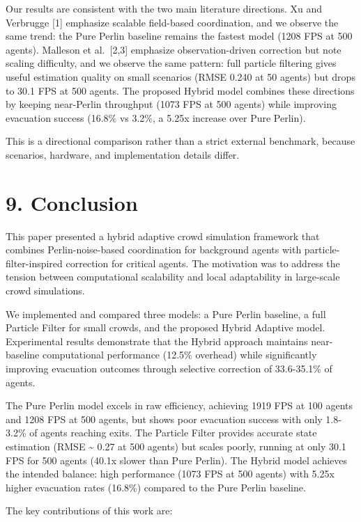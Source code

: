 \documentclass[
  11pt,
]{article}
\begin{document}
Our results are consistent with the two main literature directions. Xu
and Verbrugge {[}1{]} emphasize scalable field-based coordination, and
we observe the same trend: the Pure Perlin baseline remains the fastest
model (1208 FPS at 500 agents). Malleson et al.~{[}2,3{]} emphasize
observation-driven correction but note scaling difficulty, and we
observe the same pattern: full particle filtering gives useful
estimation quality on small scenarios (RMSE 0.240 at 50 agents) but
drops to 30.1 FPS at 500 agents. The proposed Hybrid model combines
these directions by keeping near-Perlin throughput (1073 FPS at 500
agents) while improving evacuation success (16.8\% vs 3.2\%, a 5.25x
increase over Pure Perlin).

This is a directional comparison rather than a strict external
benchmark, because scenarios, hardware, and implementation details
differ.

\section{9. Conclusion}\label{conclusion}

This paper presented a hybrid adaptive crowd simulation framework that
combines Perlin-noise-based coordination for background agents with
particle-filter-inspired correction for critical agents. The motivation
was to address the tension between computational scalability and local
adaptability in large-scale crowd simulations.

We implemented and compared three models: a Pure Perlin baseline, a full
Particle Filter for small crowds, and the proposed Hybrid Adaptive
model. Experimental results demonstrate that the Hybrid approach
maintains near-baseline computational performance (12.5\% overhead)
while significantly improving evacuation outcomes through selective
correction of 33.6-35.1\% of agents.

The Pure Perlin model excels in raw efficiency, achieving 1919 FPS at
100 agents and 1208 FPS at 500 agents, but shows poor evacuation success
with only 1.8-3.2\% of agents reaching exits. The Particle Filter
provides accurate state estimation (RMSE \textasciitilde{} 0.27 at 500
agents) but scales poorly, running at only 30.1 FPS for 500 agents
(40.1x slower than Pure Perlin). The Hybrid model achieves the intended
balance: high performance (1073 FPS at 500 agents) with 5.25x higher
evacuation rates (16.8\%) compared to the Pure Perlin baseline.

The key contributions of this work are:
\end{document}
